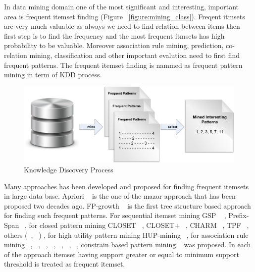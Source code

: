 In data mining domain one of the most significant and interesting, important area is frequent itemset finding (Figure ~\ref{figure:mining_class}). Freqent itmsets are very much valuable as always we need to find relation between items then first step is to find the frequency and the most frequent itmsets has high probability to be valuable. Moreover association rule mining, prediction, co-relation mining, classification and other important evalution need to first find frequent patterns. The frequent itemset finding is nammed as frequent pattern mining in term of KDD process.\\
\begin{figure}
\centering
  \includegraphics[width=.9\textwidth]{images/frequent_flow.jpg}
\caption{Knowledge Discovery Process}
\label{figure:frequent_flow}
\end{figure}
Many approaches has been developed and proposed for finding frequent itemsets in large data base. Apriori ~\cite{apriori} is the one of the mazor approach that has been proposed two decades ago. FP-growth ~\cite{fp_growth} is the first tree structure based approach for finding such frequent patterns. For sequential itemset mining GSP ~\cite{gsp} , Prefix-Span ~\cite{prefix_span}, for closed pattern mining CLOSET ~\cite{closet}, CLOSET$+$ ~\cite{closet_plus}, CHARM ~\cite{charm}, TPF ~\cite{tpf}, others (~\cite{close_1}, ~\cite{close_2}) , for high utility pattern mining HUP-mining ~\cite{hup_mining}, for association rule mining ~\cite{ass_01}, ~\cite{ass_02}, ~\cite{ass_03}, ~\cite{ass_04}, ~\cite{ass_05}, ~\cite{ass_06}, ~\cite{ass_07}, constrain based pattern mining ~\cite{const_01} was proposed. In each of the approach itemset having support greater or equal to minimum support threshold is treated as frequent itemset.

